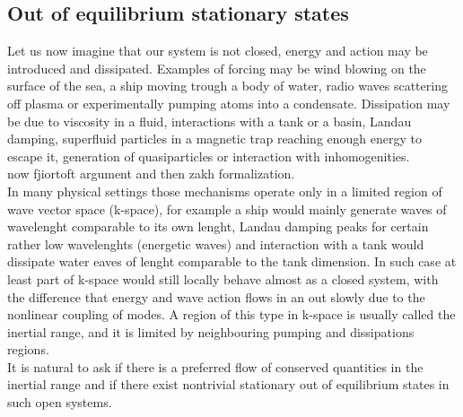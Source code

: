\subsection{Out of equilibrium stationary states}

Let us now imagine that our system is not closed, energy and action may be introduced and dissipated. Examples of forcing may be wind blowing on the surface of the sea, 
a ship moving trough a body of water, radio waves scattering off plasma or experimentally pumping atoms into a condensate. Dissipation may be due to viscosity in a fluid,
interactions with a tank or a basin, Landau damping, superfluid particles in a magnetic trap reaching enough energy to escape it, generation of quasiparticles or interaction 
with inhomogenities.\\
now fjiortoft argument and then zakh formalization.\\
In many physical settings those mechanisms operate only in a limited region of wave vector space (k-space), for example a ship would mainly generate waves of wavelenght comparable to 
its own lenght, Landau damping peaks for certain rather low wavelenghts (energetic waves) and interaction with a tank would dissipate water eaves of lenght comparable to the tank dimension. In such 
case at least part of  k-space would still locally behave almost as a closed system, with the difference that energy and wave action flows in an out slowly due to the nonlinear 
coupling of modes. A region of this type in k-space is usually called the inertial range, and it is limited by neighbouring pumping and dissipations regions.\\
It is natural to ask if there is a preferred flow of conserved quantities in the inertial range and if there exist nontrivial stationary out of equilibrium 
states in such open systems. \\
